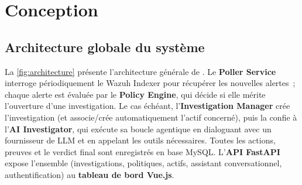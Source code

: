 \chapter{Conception}
\label{chap:conception}

\section{Architecture globale du système}

La \cref{fig:architecture} présente l'architecture générale de
\projectname. Le \textbf{Poller Service} interroge périodiquement le Wazuh
Indexer pour récupérer les nouvelles alertes~; chaque alerte est évaluée par
le \textbf{Policy Engine}, qui décide si elle mérite l'ouverture d'une
investigation. Le cas échéant, l'\textbf{Investigation Manager} crée
l'investigation (et associe/crée automatiquement l'actif concerné), puis la
confie à l'\textbf{AI Investigator}, qui exécute sa boucle agentique en
dialoguant avec un fournisseur de LLM et en appelant les outils nécessaires.
Toutes les actions, preuves et le verdict final sont enregistrés en base
MySQL. L'\textbf{API FastAPI} expose l'ensemble (investigations, politiques,
actifs, assistant conversationnel, authentification) au \textbf{tableau de
bord Vue.js}.

